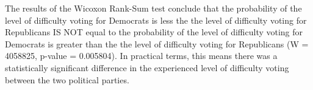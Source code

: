 \documentclass[
]{article}
\newenvironment{Shaded}{\begin{snugshade}}{\end{snugshade}}
\newcommand{\KeywordTok}[1]{\textcolor[rgb]{0.13,0.29,0.53}{\textbf{#1}}}
\newcommand{\NormalTok}[1]{#1}
\newcommand{\OperatorTok}[1]{\textcolor[rgb]{0.81,0.36,0.00}{\textbf{#1}}}
\newcommand{\StringTok}[1]{\textcolor[rgb]{0.31,0.60,0.02}{#1}}
\begin{document}
\begin{Shaded}
\end{Shaded}

The results of the Wicoxon Rank-Sum test conclude that the probability of the level of difficulty voting for Democrats is less the the level of difficulty voting for Republicans IS NOT equal to the probability of the level of difficulty voting for Democrats is greater than the the level of difficulty voting for Republicans (W = 4058825, p-value = 0.005804). In practical terms, this means there was a statistically significant difference in the experienced level of difficulty voting between the two political parties.
\end{document}
